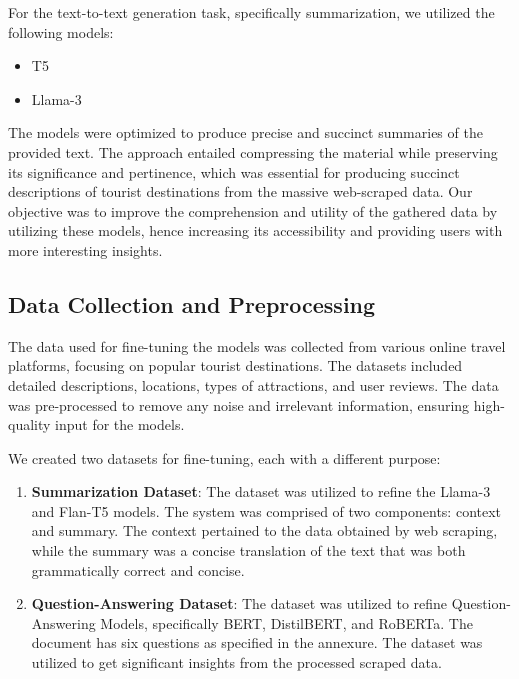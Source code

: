 \documentclass[conference]{IEEEtran}
\begin{document}
        For the text-to-text generation task, specifically summarization, we utilized the following models:
        \begin{itemize}
            \item T5
            \item Llama-3
        \end{itemize}

        The models were optimized to produce precise and succinct summaries of the provided text. The approach entailed compressing the material while preserving its significance and pertinence, which was essential for producing succinct descriptions of tourist destinations from the massive web-scraped data.
        Our objective was to improve the comprehension and utility of the gathered data by utilizing these models, hence increasing its accessibility and providing users with more interesting insights.

    \subsection{Data Collection and Preprocessing}

        The data used for fine-tuning the models was collected from various online travel platforms, focusing on popular tourist destinations. The datasets included detailed descriptions, locations, types of attractions, and user reviews. The data was pre-processed to remove any noise and irrelevant information, ensuring high-quality input for the models.

        We created two datasets for fine-tuning, each with a different purpose:

        \begin{enumerate}
            \item \textbf{Summarization Dataset}: The dataset was utilized to refine the Llama-3 and Flan-T5 models. The system was comprised of two components: context and summary. The context pertained to the data obtained by web scraping, while the summary was a concise translation of the text that was both grammatically correct and concise.
            \item \textbf{Question-Answering Dataset}: The dataset was utilized to refine Question-Answering Models, specifically BERT, DistilBERT, and RoBERTa. The document has six questions as specified in the annexure. The dataset was utilized to get significant insights from the processed scraped data.
        \end{enumerate}
\end{document}
